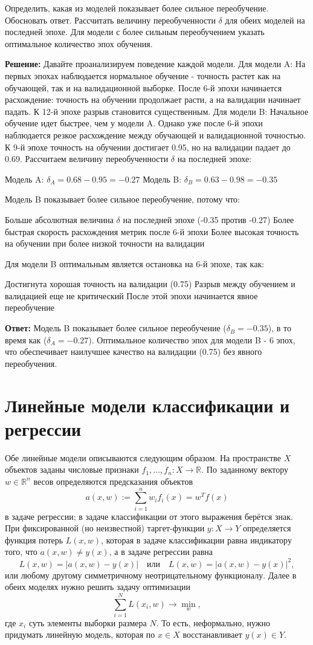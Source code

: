 Определить, какая из моделей показывает более сильное переобучение. Обосновать ответ.
Рассчитать величину переобученности $\delta$ для обеих моделей на последней эпохе.
Для модели с более сильным переобучением указать оптимальное количество эпох обучения.

\textbf{Решение:}
Давайте проанализируем поведение каждой модели.
Для модели A:
На первых эпохах наблюдается нормальное обучение - точность растет как на обучающей, так и на валидационной выборке. После 6-й эпохи начинается расхождение: точность на обучении продолжает расти, а на валидации начинает падать. К 12-й эпохе разрыв становится существенным.
Для модели B:
Начальное обучение идет быстрее, чем у модели A. Однако уже после 6-й эпохи наблюдается резкое расхождение между обучающей и валидационной точностью. К 9-й эпохе точность на обучении достигает 0.95, но на валидации падает до 0.69.
Рассчитаем величину переобученности $\delta$ на последней эпохе:

Модель A: $\delta_A = 0.68 - 0.95 = -0.27$
Модель B: $\delta_B = 0.63 - 0.98 = -0.35$

Модель B показывает более сильное переобучение, потому что:

Больше абсолютная величина $\delta$ на последней эпохе (-0.35 против -0.27)
Более быстрая скорость расхождения метрик после 6-й эпохи
Более высокая точность на обучении при более низкой точности на валидации

Для модели B оптимальным является остановка на 6-й эпохе, так как:

Достигнута хорошая точность на валидации (0.75)
Разрыв между обучением и валидацией еще не критический
После этой эпохи начинается явное переобучение

\textbf{Ответ:}
Модель B показывает более сильное переобучение ($\delta_B = -0.35$), в то время как ($\delta_A = -0.27$). Оптимальное количество эпох для модели B - 6 эпох, что обеспечивает наилучшее качество на валидации (0.75) без явного переобучения.

\section{Линейные модели классификации и регрессии}

Обе линейные модели описываются следующим образом.
На пространстве $X$ объектов заданы числовые признаки \( f_1, \ldots, f_n\colon X\to\mathbb{R}\). По заданному вектору \(w\in\mathbb{R}^n\) весов определяются предсказания объектов
\[
    a(x,w) := \sum_{i=1}^n w_if_i(x) = w^Tf(x)
\]
в задаче регрессии; в задаче классификации от этого выражения берётся знак. При фиксированной (но неизвестной) таргет-функции \( y\colon X\to Y\) определяется функция потерь \( L(x, w)\), которая в задаче классификации равна индикатору того, что \(a(x,w) \neq y(x)\), а в задаче регрессии равна
\[
    L(x,w) = \lvert{a(x,w)-y(x)}\rvert
    \quad\text{или}\quad
    L(x,w) = \lvert{a(x,w)-y(x)}\rvert^2,
\]
или любому другому симметричному неотрицательному функционалу.
Далее в обеих моделях нужно решить задачу оптимизации
\[
    \sum_{i=1}^N L(x_i, w) \to \min_{w},
\]
где $x_i$ суть элементы выборки размера $N$. То есть, неформально, нужно придумать линейную модель, которая по $x \in X$ восстанавливает $y(x) \in Y$.


